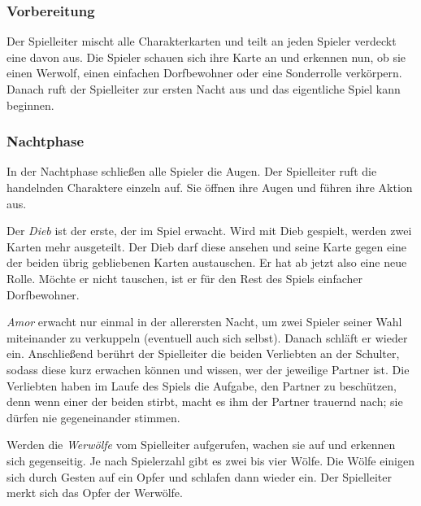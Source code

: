 \documentclass[12pt, a4paper]{article}
\begin{document}
		\subsubsection{Vorbereitung}
Der Spielleiter mischt alle Charakterkarten und teilt an jeden Spieler verdeckt eine davon aus. Die Spieler schauen sich ihre Karte an und erkennen nun, ob sie einen Werwolf, einen einfachen Dorfbewohner oder eine Sonderrolle verkörpern. Danach ruft der Spielleiter zur ersten Nacht aus und das eigentliche Spiel kann beginnen.


		\subsubsection{Nachtphase}
In der Nachtphase schließen alle Spieler die Augen. Der Spielleiter ruft die handelnden Charaktere einzeln auf. Sie öffnen ihre Augen und führen ihre Aktion aus.

\vspace{0,3 cm}

Der \textit{Dieb} ist der erste, der im Spiel erwacht. Wird mit Dieb gespielt, werden zwei Karten mehr ausgeteilt. Der Dieb darf diese ansehen und seine Karte gegen eine der beiden übrig gebliebenen Karten austauschen. Er hat ab jetzt also eine neue Rolle. Möchte er nicht tauschen, ist er für den Rest des Spiels einfacher Dorfbewohner.

\vspace{0,3 cm}

\textit{Amor} erwacht nur einmal in der allerersten Nacht, um zwei Spieler seiner Wahl miteinander zu
verkuppeln (eventuell auch sich selbst). Danach schläft er wieder ein. Anschließend berührt der
Spielleiter die beiden Verliebten an der Schulter, sodass diese kurz erwachen können und wissen,
wer der jeweilige Partner ist. Die Verliebten haben im Laufe des Spiels die Aufgabe, den Partner
zu beschützen, denn wenn einer der beiden stirbt, macht es ihm der Partner trauernd nach; sie
dürfen nie gegeneinander stimmen.

\vspace{0,3 cm}

Werden die \textit{Werwölfe} vom Spielleiter aufgerufen, wachen sie auf und erkennen sich gegenseitig.
Je nach Spielerzahl gibt es zwei bis vier Wölfe. Die Wölfe einigen sich durch Gesten auf ein Opfer und schlafen dann wieder ein.
Der Spielleiter merkt sich das Opfer der Werwölfe.

\vspace{0,3 cm}
\end{document}
